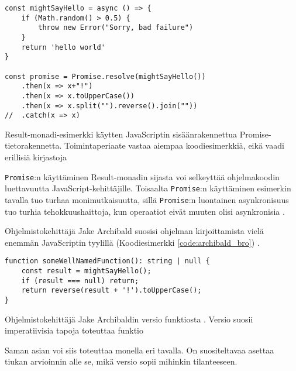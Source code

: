 \begin{code}
    \begin{verbatim}
const mightSayHello = async () => {
    if (Math.random() > 0.5) {
        throw new Error("Sorry, bad failure")
    }
    return 'hello world'
}
    
const promise = Promise.resolve(mightSayHello())
    .then(x => x+"!")
    .then(x => x.toUpperCase())
    .then(x => x.split("").reverse().join(""))
//  .catch(x => x)
\end{verbatim}
    \caption{Result-monadi-esimerkki käytten JavaScriptin sisäänrakennettua Promise-tietorakennetta. Toimintaperiaate vastaa aiempaa koodiesimerkkiä, eikä vaadi erillisiä kirjastoja}
    \label{code:result_monad_example_4}
\end{code}

\texttt{Promise}:n käyttäminen Result-monadin sijasta voi selkeyttää ohjelmakoodin luettavuutta JavaScript-kehittäjille. Toisaalta \texttt{Promise}:n käyttäminen esimerkin tavalla tuo turhaa monimutkaisuutta, sillä \texttt{Promise}:n luontainen asynkronisuus tuo turhia tehokkuushaittoja, kun operaatiot eivät muuten olisi asynkronisia \cite{mdn_promise}.

Ohjelmistokehittäjä Jake Archibald suosisi ohjelman kirjoittamista vielä enemmän JavaScriptin tyylillä (Koodiesimerkki \ref{code:archibald_bro}) \cite{pennane_fp_gist} .

\begin{code}
    \begin{verbatim}
function someWellNamedFunction(): string | null {
    const result = mightSayHello();
    if (result === null) return;
    return reverse(result + '!').toUpperCase();
}
\end{verbatim}
    \caption{Ohjelmistokehittäjä Jake Archibaldin versio funktiosta \cite{pennane_fp_gist}. Versio suosii imperatiivisia tapoja toteuttaa funktio}
    \label{code:archibald_bro}
\end{code}

Saman asian voi siis toteuttaa monella eri tavalla. On suositeltavaa asettaa tiukan arvioinnin alle se, mikä versio sopii mihinkin tilanteeseen.

